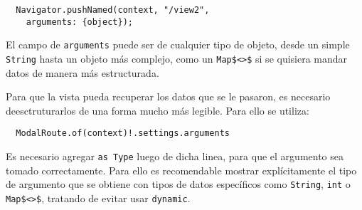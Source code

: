 \begin{center}
\begin{lstlisting}
  Navigator.pushNamed(context, "/view2",
    arguments: {object});
\end{lstlisting}
\end{center}

El campo de \lstinline{arguments} puede ser de cualquier tipo de objeto, desde un simple \lstinline{String} hasta un objeto más complejo, como un \lstinline{Map$<>$} si se quisiera mandar datos de manera más estructurada.

Para que la vista pueda recuperar los datos que se le pasaron, es necesario deesctruturarlos de una forma mucho más legible. Para ello se utiliza:

\begin{center}
\begin{lstlisting}
  ModalRoute.of(context)!.settings.arguments
\end{lstlisting}
\end{center}

Es necesario agregar \lstinline{as Type} luego de dicha linea, para que el argumento sea tomado correctamente. Para ello es recomendable mostrar explícitamente el tipo de argumento que se obtiene con tipos de datos específicos como \lstinline{String}, \lstinline{int} o \lstinline{Map$<>$}, tratando de evitar usar \lstinline{dynamic}.